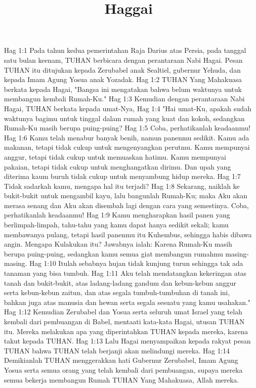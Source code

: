 

\title{Haggai}

Hag 1:1  Pada tahun kedua pemerintahan Raja Darius atas Persia, pada tanggal satu bulan keenam, TUHAN berbicara dengan perantaraan Nabi Hagai. Pesan TUHAN itu ditujukan kepada Zerubabel anak Sealtiel, gubernur Yehuda, dan kepada Imam Agung Yosua anak Yozadak.
Hag 1:2  TUHAN Yang Mahakuasa berkata kepada Hagai, "Bangsa ini mengatakan bahwa belum waktunya untuk membangun kembali Rumah-Ku."
Hag 1:3  Kemudian dengan perantaraan Nabi Hagai, TUHAN berkata kepada umat-Nya,
Hag 1:4  "Hai umat-Ku, apakah sudah waktunya bagimu untuk tinggal dalam rumah yang kuat dan kokoh, sedangkan Rumah-Ku masih berupa puing-puing?
Hag 1:5  Coba, perhatikanlah keadaanmu!
Hag 1:6  Kamu telah menabur banyak benih, namun panenmu sedikit. Kamu ada makanan, tetapi tidak cukup untuk mengenyangkan perutmu. Kamu mempunyai anggur, tetapi tidak cukup untuk memuaskan hatimu. Kamu mempunyai pakaian, tetapi tidak cukup untuk menghangatkan dirimu. Dan upah yang diterima kaum buruh tidak cukup untuk menyambung hidup mereka.
Hag 1:7  Tidak sadarkah kamu, mengapa hal itu terjadi?
Hag 1:8  Sekarang, naiklah ke bukit-bukit untuk mengambil kayu, lalu bangunlah Rumah-Ku; maka Aku akan merasa senang dan Aku akan disembah lagi dengan cara yang semestinya. Coba, perhatikanlah keadaanmu!
Hag 1:9  Kamu mengharapkan hasil panen yang berlimpah-limpah, tahu-tahu yang kamu dapat hanya sedikit sekali; kamu membawanya pulang, tetapi hasil panenmu itu Kuhembus, sehingga habis dibawa angin. Mengapa Kulakukan itu? Jawabnya ialah: Karena Rumah-Ku masih berupa puing-puing, sedangkan kamu semua giat membangun rumahmu masing-masing.
Hag 1:10  Itulah sebabnya hujan tidak kunjung turun sehingga tak ada tanaman yang bisa tumbuh.
Hag 1:11  Aku telah mendatangkan kekeringan atas tanah dan bukit-bukit, atas ladang-ladang gandum dan kebun-kebun anggur serta kebun-kebun zaitun, dan atas segala tumbuh-tumbuhan di tanah ini, bahkan juga atas manusia dan hewan serta segala sesuatu yang kamu usahakan."
Hag 1:12  Kemudian Zerubabel dan Yosua serta seluruh umat Israel yang telah kembali dari pembuangan di Babel, mentaati kata-kata Hagai, utusan TUHAN itu. Mereka melakukan apa yang diperintahkan TUHAN kepada mereka, karena takut kepada TUHAN.
Hag 1:13  Lalu Hagai menyampaikan kepada rakyat pesan TUHAN bahwa TUHAN telah berjanji akan melindungi mereka.
Hag 1:14  Demikianlah TUHAN menggerakkan hati Gubernur Zerubabel, Imam Agung Yosua serta semua orang yang telah kembali dari pembuangan, supaya mereka semua bekerja membangun Rumah TUHAN Yang Mahakuasa, Allah mereka.
